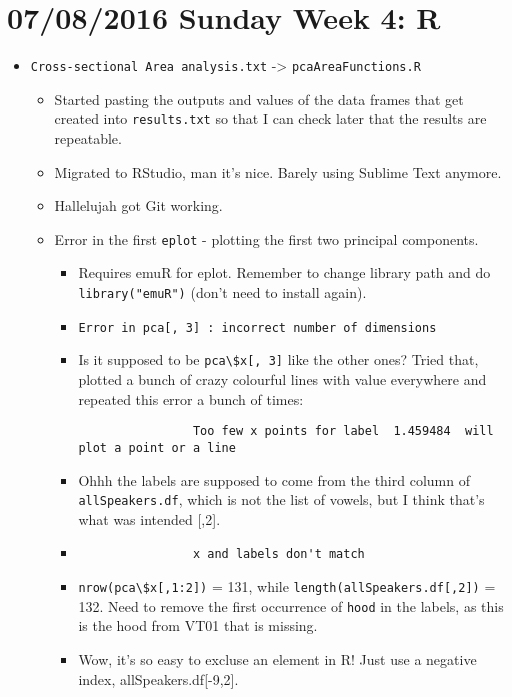 \documentclass{article}
\begin{document}
\section*{07/08/2016 Sunday Week 4: R}
\begin{itemize}
    \item \verb|Cross-sectional Area analysis.txt| -> \verb|pcaAreaFunctions.R|
    \begin{itemize}
        \item Started pasting the outputs and values of the data frames that get created into \verb|results.txt| so that I can check later that the results are repeatable.
        \item Migrated to RStudio, man it's nice. Barely using Sublime Text anymore.
        \item Hallelujah got Git working.
        \item Error in the first \verb|eplot| - plotting the first two principal components.
        \begin{itemize}
            \item Requires emuR for eplot. Remember to change library path and do \verb|library("emuR")| (don't need to install again).
            \item \begin{verbatim}Error in pca[, 3] : incorrect number of dimensions\end{verbatim}
            \item Is it supposed to be \verb|pca\$x[, 3]| like the other ones? Tried that, plotted a bunch of crazy colourful lines with value everywhere and repeated this error a bunch of times: \begin{verbatim}
                Too few x points for label  1.459484  will plot a point or a line
            \end{verbatim}
            \item Ohhh the labels are supposed to come from the third column of \verb|allSpeakers.df|, which is not the list of vowels, but I think that's what was intended [,2].
            \item \begin{verbatim}
                x and labels don't match
            \end{verbatim}
            \item \verb|nrow(pca\$x[,1:2])| = 131, while \verb|length(allSpeakers.df[,2])| = 132. Need to remove the first occurrence of \verb|hood| in the labels, as this is the hood from VT01 that is missing. 
            \item Wow, it's so easy to excluse an element in R! Just use a negative index, allSpeakers.df[-9,2].

\end{itemize}
\end{itemize}
\end{itemize}
\end{document}
